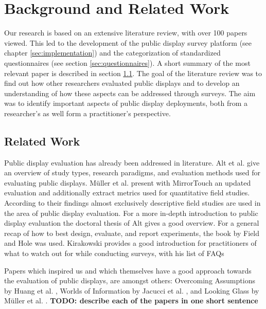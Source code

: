 \section{Background and Related Work} %
\label{chapter:background_related-work}

	Our research is based on an extensive literature review, with over 100 papers viewed. This led to the development of the public display survey platform (see chapter \ref{sec:implementation}) and the categorization of standardized questionnaires (see section \ref{sec:questionnaires}). A short summary of the most relevant paper is described in section \ref{sec:related-work}.
	The goal of the literature review was to find out how other researchers evaluated public displays and to develop an understanding of how these aspects can be addressed through surveys. The aim was to identify important aspects of public display deployments, both from a researcher's as well form a practitioner's perspective. 


\subsection{Related Work}
\label{sec:related-work}

	Public display evaluation has already been addressed in literature. Alt et al. \cite{Alt2012HowToEvaluate} give an overview of study types, research paradigms, and evaluation methods used for evaluating public displays. M{\"u}ller et al. present with MirrorTouch \cite{muller2014mirrortouch} an updated evaluation and additionally extract metrics used for quantitative field studies. According to their findings almost exclusively descriptive field studies are used in the area of public display evaluation. For a more in-depth introduction to public display evaluation the doctoral thesis of Alt \cite{alt2013thesis} gives a good overview.
	For a general recap of how to best design, evaluate, and report experiments, the book by Field and Hole \cite{field2003design} was used. Kirakowski \cite{kirakowski2000questionnaireFAQ} provides a good introduction for practitioners of what to watch out for while conducting surveys, with his list of FAQs

	Papers which inspired us and which themselves have a good approach towards the evaluation of public displays, are amongst others: Overcoming Assumptions by Huang et al. \cite{huang2008overcoming}, Worlds of Information by Jacucci et al. \cite{jacucci2010worldsofinformation}, and Looking Glass by M{\"u}ller et al. \cite{Muller2012LookingGlass}. 
		\textbf{TODO: describe each of the papers in one short sentence}

